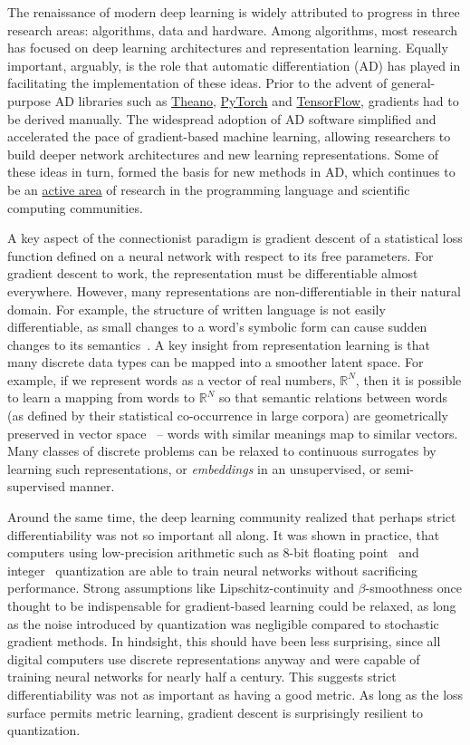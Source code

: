 \documentclass[12pt,initial,twoside,maitrise]{dms}
\numberwithin{equation}{section}
\numberwithin{table}{chapter}
\numberwithin{figure}{chapter}
\begin{document}
The renaissance of modern deep learning is widely attributed to progress in three research areas: algorithms, data and hardware. Among algorithms, most research has focused on deep learning architectures and representation learning. Equally important, arguably, is the role that automatic differentiation (AD) has played in facilitating the implementation of these ideas. Prior to the advent of general-purpose AD libraries such as \href{http://deeplearning.net/software/theano/}{Theano}, \href{https://pytorch.org/}{PyTorch} and \href{http://tensorflow.org/}{TensorFlow}, gradients had to be derived manually. The widespread adoption of AD software simplified and accelerated the pace of gradient-based machine learning, allowing researchers to build deeper network architectures and new learning representations. Some of these ideas in turn, formed the basis for new methods in AD, which continues to be an \href{http://www.autodiff.org}{active area} of research in the programming language and scientific computing communities.

A key aspect of the connectionist paradigm is gradient descent of a statistical loss function defined on a neural network with respect to its free parameters. For gradient descent to work, the representation must be differentiable almost everywhere. However, many representations are non-differentiable in their natural domain. For example, the structure of written language is not easily differentiable, as small changes to a word's symbolic form can cause sudden changes to its semantics~\citep{vanmerrienboer2018phd}. A key insight from representation learning is that many discrete data types can be mapped into a smoother latent space. For example, if we represent words as a vector of real numbers, $\mathbb R^N$, then it is possible to learn a mapping from words to $\mathbb R^N$ so that semantic relations between words (as defined by their statistical co-occurrence in large corpora) are geometrically preserved in vector space~\citep{pennington2014glove} -- words with similar meanings map to similar vectors. Many classes of discrete problems can be relaxed to continuous surrogates by learning such representations, or \textit{embeddings} in an unsupervised, or semi-supervised manner.

Around the same time, the deep learning community realized that perhaps strict differentiability was not so important all along. It was shown in practice, that computers using low-precision arithmetic such as 8-bit floating point~\citep{wang2018training} and integer~\citep{jacob2018quantization} quantization are able to train neural networks without sacrificing performance. Strong assumptions like Lipschitz-continuity and $\beta$-smoothness once thought to be indispensable for gradient-based learning could be relaxed, as long as the noise introduced by quantization was negligible compared to stochastic gradient methods. In hindsight, this should have been less surprising, since all digital computers use discrete representations anyway and were capable of training neural networks for nearly half a century. This suggests strict differentiability was not as important as having a good metric. As long as the loss surface permits metric learning, gradient descent is surprisingly resilient to quantization.
\end{document}
